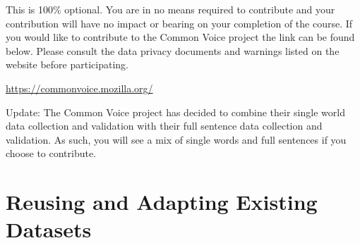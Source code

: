 This is 100\% optional. You are in no means required to contribute and your contribution will have no impact or bearing on your completion of the course. If you would like to contribute to the Common Voice project the link can be found below. Please consult the data privacy documents and warnings listed on the website before participating.

\url{https://commonvoice.mozilla.org/}

Update: The Common Voice project has decided to combine their single world data collection and validation with their full sentence data collection and validation. As such, you will see a mix of single words and full sentences if you choose to contribute.

\section{Reusing and Adapting Existing Datasets}

